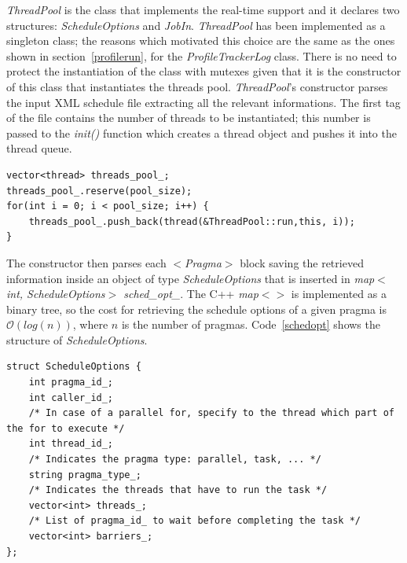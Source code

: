 \documentclass[a4paper,12pt,oneside]{book}
\begin{document}
\emph{ThreadPool} is the class that implements the real-time support and it declares two structures: \emph{ScheduleOptions} and \emph{JobIn}. \emph{ThreadPool} has been implemented as a singleton class; the reasons which motivated this choice are the same as the ones shown in section~\ref{profilerun}, for the \emph{ProfileTrackerLog} class. There is no need to protect the instantiation of the class with mutexes given that it is the constructor of this class that instantiates the threads pool.
\emph{ThreadPool}’s constructor parses the input XML schedule file extracting all the relevant informations. The first tag of the file contains the number of threads to be instantiated; this number is passed to the \emph{init()} function which creates a thread object and pushes it into the thread queue.
\begin{lstlisting}[language=CCC, caption=Initialization of the thread pool., label=pool]
vector<thread> threads_pool_;
threads_pool_.reserve(pool_size);
for(int i = 0; i < pool_size; i++) {
    threads_pool_.push_back(thread(&ThreadPool::run,this, i));
}
\end{lstlisting}

The constructor then parses each \emph{$<$Pragma$>$} block saving the retrieved information inside an object of type \emph{ScheduleOptions} that is inserted in \emph{map$<$int, ScheduleOptions$>$ sched\_opt\_}. The C++ \emph{map$<>$} is implemented as a binary tree, so the cost for retrieving the schedule options of a given pragma is $\mathcal{O}(log(n))$, where $n$ is the number of pragmas.  Code~\ref{schedopt} shows the structure of \emph{ScheduleOptions}.

\begin{lstlisting}[language=CCC, label=schedopt]
struct ScheduleOptions {
    int pragma_id_;
    int caller_id_;
    /* In case of a parallel for, specify to the thread which part of the for to execute */
    int thread_id_;
    /* Indicates the pragma type: parallel, task, ... */
    string pragma_type_;
    /* Indicates the threads that have to run the task */
    vector<int> threads_;
    /* List of pragma_id_ to wait before completing the task */
    vector<int> barriers_;
};
\end{lstlisting}
\end{document}
